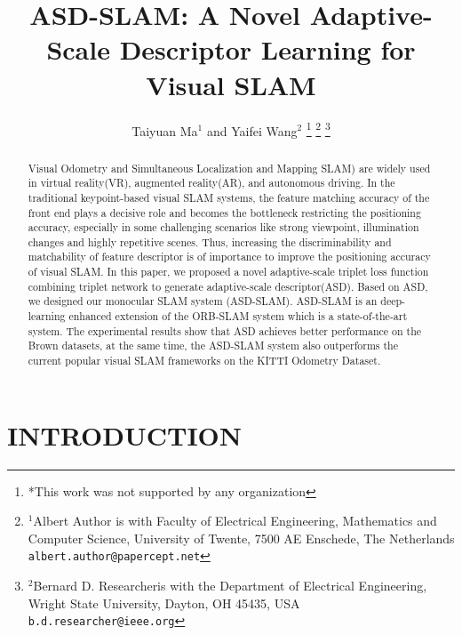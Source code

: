 \documentclass[letterpaper, 10 pt, conference]{ieeeconf}  %
\title{\LARGE \bf
ASD-SLAM:  A Novel Adaptive-Scale Descriptor Learning for Visual SLAM 
}
\author{Taiyuan Ma$^{1}$ and Yaifei Wang$^{2}$%
\thanks{*This work was not supported by any organization}%
\thanks{$^{1}$Albert Author is with Faculty of Electrical Engineering, Mathematics and Computer Science,
        University of Twente, 7500 AE Enschede, The Netherlands
        {\tt\small albert.author@papercept.net}}%
\thanks{$^{2}$Bernard D. Researcheris with the Department of Electrical Engineering, Wright State University,
        Dayton, OH 45435, USA
        {\tt\small b.d.researcher@ieee.org}}%
}
\begin{document}
\maketitle
\thispagestyle{empty}
\pagestyle{empty}


\begin{abstract}

Visual Odometry and Simultaneous Localization and Mapping SLAM) are widely used in virtual reality(VR), augmented reality(AR), and autonomous driving. In the traditional keypoint-based visual SLAM systems, the feature matching accuracy of the front end plays a decisive role and becomes the bottleneck restricting the positioning accuracy, especially in some challenging scenarios like strong viewpoint, illumination changes and highly repetitive scenes. Thus, increasing the discriminability and matchability of feature descriptor is of importance to improve the positioning accuracy of visual SLAM.  In this paper, we proposed a novel adaptive-scale triplet loss function combining triplet network to generate adaptive-scale descriptor(ASD). Based on ASD, we designed our monocular SLAM system (ASD-SLAM). ASD-SLAM is an deep-learning enhanced extension of the ORB-SLAM system which is a state-of-the-art system. The experimental results show that ASD achieves better performance on the Brown datasets, at the same time, the ASD-SLAM system also outperforms the current popular visual SLAM frameworks on the KITTI Odometry Dataset. 
\end{abstract}


\section{INTRODUCTION}
\end{document}
